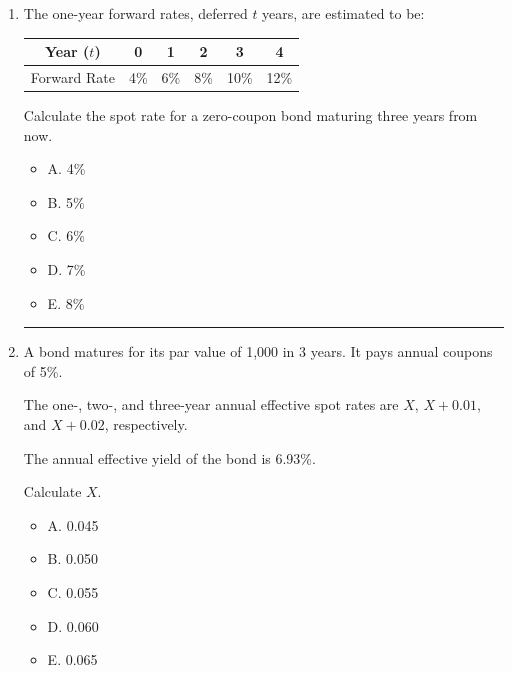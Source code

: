 \documentclass[11pt]{article}
\begin{document}
\begin{enumerate}[label=\textbf{\arabic*.}]
If the investment is purchased now at its value based on the term structure of interest rates, what is the overall yield rate on this investment?

\begin{itemize}
\item A. 7.1\%
\item B. 7.2\%
\item C. 7.3\%
\item D. 7.4\%
\item E. 7.5\%
\end{itemize}


\medskip
\hrule
\medskip




\item The one-year forward rates, deferred $t$ years, are estimated to be:

\begin{center}
\begin{tabular}{cccccc}
\toprule
Year ($t$) & 0 & 1 & 2 & 3 & 4 \\
\midrule
Forward Rate & 4\% & 6\% & 8\% & 10\% & 12\% \\
\bottomrule
\end{tabular}
\end{center}

Calculate the spot rate for a zero-coupon bond maturing three years from now.

\begin{itemize}
\item A. 4\%
\item B. 5\%
\item C. 6\%
\item D. 7\%
\item E. 8\%
\end{itemize}

\medskip
\hrule
\medskip


\item A bond matures for its par value of 1,000 in 3 years. It pays annual coupons of 5\%.

The one-, two-, and three-year annual effective spot rates are $X$, $X + 0.01$, and $X + 0.02$, respectively.

The annual effective yield of the bond is 6.93\%.

Calculate $X$.

\begin{itemize}
\item A. 0.045
\item B. 0.050
\item C. 0.055
\item D. 0.060
\item E. 0.065
\end{itemize}


\end{enumerate}
\end{document}
